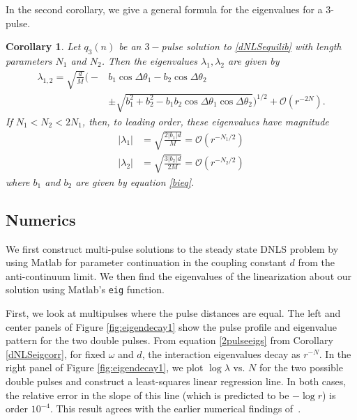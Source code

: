 \documentclass[12pt]{article}
\newtheorem{corollary}{Corollary}
\begin{document}
In the second corollary, we give a general formula for the eigenvalues for a 3-pulse.

\begin{corollary}\label{dNLSeigcorr2}
Let $q_3(n)$ be an $3-$pulse solution to \eqref{dNLSequilib} with length parameters $N_1$ and $N_2$. Then the eigenvalues $\lambda_1, \lambda_2$ are given by
\begin{equation}\label{3pulseeigs}
\begin{aligned}
\lambda_{1,2} = \sqrt{\frac{d}{M}}
\Big( -&b_1\cos\Delta\theta_1 - b_2\cos\Delta\theta_2  \\
&\pm \sqrt{b_1^2 + b_2^2 - b_1 b_2\cos\Delta\theta_1 \cos\Delta\theta_2} \Big)^{1/2} + \mathcal{O}(r^{-2N}).
\end{aligned}
\end{equation}
If $N_1 < N_2 < 2 N_1$, then, to leading order, these eigenvalues have magnitude
\begin{equation}\label{3pulsemag}
\begin{aligned}
|\lambda_1| &= \sqrt{\frac{2 |b_1| d}{M}} = \mathcal{O}(r^{-N_1/2}) \\
|\lambda_2| &= \sqrt{\frac{3 |b_2| d}{2 M}} = \mathcal{O}(r^{-N_2/2})
\end{aligned}
\end{equation}
where $b_1$ and $b_2$ are given by equation \eqref{bieq}.
\end{corollary}

\subsection{Numerics}

We first construct multi-pulse solutions to the steady state DNLS problem by using Matlab for parameter continuation in the coupling constant $d$ from the anti-continuum limit. We then find the eigenvalues of the linearization about our solution using Matlab's \texttt{eig} function. 

First, we look at multipulses where the pulse distances are equal.  The left and center panels of Figure \ref{fig:eigendecay1} show the pulse profile and eigenvalue pattern for the two double pulses. From equation \eqref{2pulseeigs} from Corollary \ref{dNLSeigcorr}, for fixed $\omega$ and $d$, the interaction eigenvalues decay as $r^{-N}$. In the right panel of Figure \ref{fig:eigendecay1}, we plot $\log \lambda$ vs. $N$ for the two possible double pulses and construct a least-squares linear regression line. In both cases, the relative error in the slope of this line (which is predicted to be $-\log r$) is order $10^{-4}$. This result agrees with the earlier numerical findings of~\cite{Kapitula2001a}.
\end{document}
